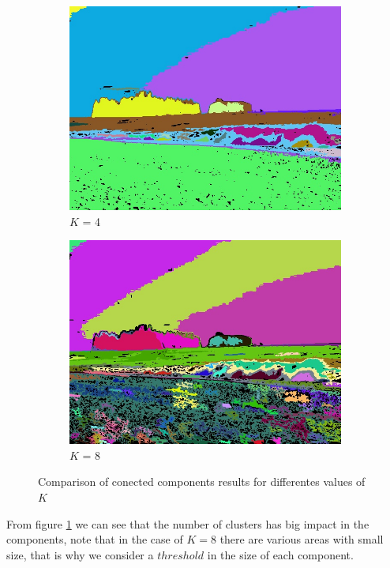 \begin{figure}[H]
\begin{subfigure}{0.5\textwidth}
        \centering
        \includegraphics[width=0.9\linewidth]{figs/beach_1_compK4.jpg}
        \caption{$K$ = 4}
    \end{subfigure}%
    \begin{subfigure}{0.5\textwidth}
	  \centering
	  \includegraphics[width=0.9\linewidth]{figs/beach_1_compK8.jpg}
	\caption{$K$ = 8}
	\end{subfigure}
	
    \caption{Comparison of conected components results for differentes values of $K$}
	\label{fig:components}
\end{figure}

From figure \ref{fig:components} we can see that the number of clusters has big impact in the components, note that in the case of $K= 8$ there are various areas with small size, that is why we consider a $threshold$ in the size of each component.

